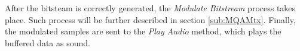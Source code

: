\documentclass[12pt,a4paper,openright]{report}
\begin{document}
After the bitsteam is correctly generated, the \emph{Modulate Bitstream} process takes place. Such process will be further described in section \ref{sub:MQAMtx}. Finally, the modulated samples are sent to the \emph{Play Audio} method, which plays the buffered data as sound.
 


\end{document}
